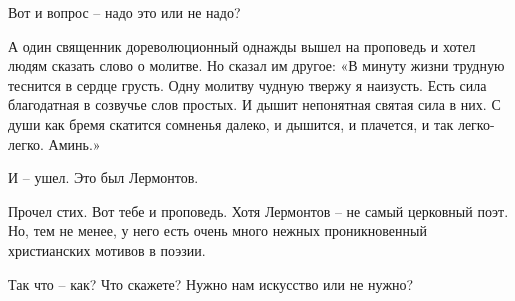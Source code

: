 Вот и вопрос – надо это или не надо? 

А один священник дореволюционный однажды вышел на проповедь и хотел людям
сказать слово о молитве. Но сказал им другое: «В минуту жизни трудную теснится
в сердце грусть. Одну молитву чудную твержу я наизусть. Есть сила благодатная в
созвучье слов простых. И дышит непонятная святая сила в них. С души как бремя
скатится сомненья далеко, и дышится, и плачется, и так легко-легко. Аминь.» 

И – ушел. Это был Лермонтов. 

Прочел стих. Вот тебе и проповедь. Хотя Лермонтов – не самый церковный поэт.
Но, тем не менее, у него есть очень много нежных проникновенный христианских
мотивов в поэзии. 

Так что – как? Что скажете? Нужно нам искусство или не нужно? 
